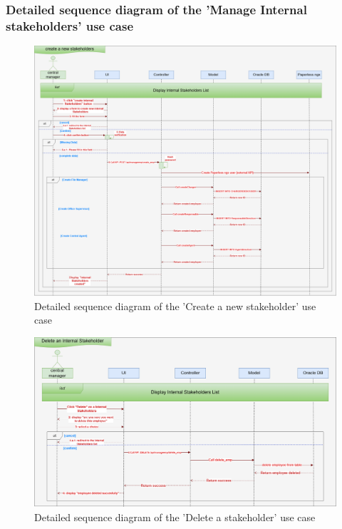 \subsubsection{Detailed sequence diagram of the 'Manage Internal stakeholders' use case}
\begin{figure}[h!]
    \centering
    \includegraphics[width=1\textwidth]{figures/det Manages Internal Stakeholders create.png}
    \caption{Detailed sequence diagram of the 'Create a new stakeholder' use case}
    \label{fig:image4}
\end{figure}
\begin{figure}[h!]
    \centering
    \includegraphics[width=1\textwidth]{figures/det Manages Internal Stakeholders delete.png}
    \caption{Detailed sequence diagram of the 'Delete a stakeholder' use case}
\end{figure}
